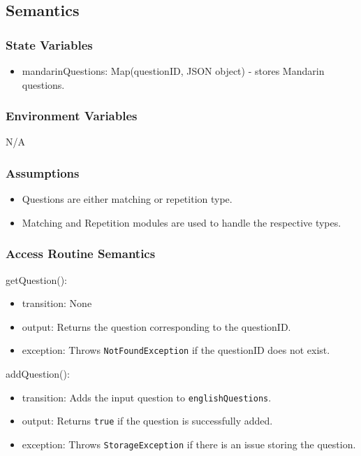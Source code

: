 \documentclass[12pt, titlepage]{article}
\begin{document}
\subsection{Semantics}

\subsubsection{State Variables}

\begin{itemize}
  \item mandarinQuestions: Map(questionID, JSON object) - stores Mandarin questions.
\end{itemize}

\subsubsection{Environment Variables}

N/A

\subsubsection{Assumptions}

\begin{itemize}
  \item Questions are either matching or repetition type.
  \item Matching and Repetition modules are used to handle the respective types.
\end{itemize}

\subsubsection{Access Routine Semantics}

\noindent getQuestion():
\begin{itemize}
\item transition: None
\item output: Returns the question corresponding to the questionID.
\item exception: Throws \texttt{NotFoundException} if the questionID does not exist.
\end{itemize}

\noindent addQuestion():
\begin{itemize}
\item transition: Adds the input question to \texttt{englishQuestions}.
\item output: Returns \texttt{true} if the question is successfully added.
\item exception: Throws \texttt{StorageException} if there is an issue storing the question.
\end{itemize}
\end{document}
